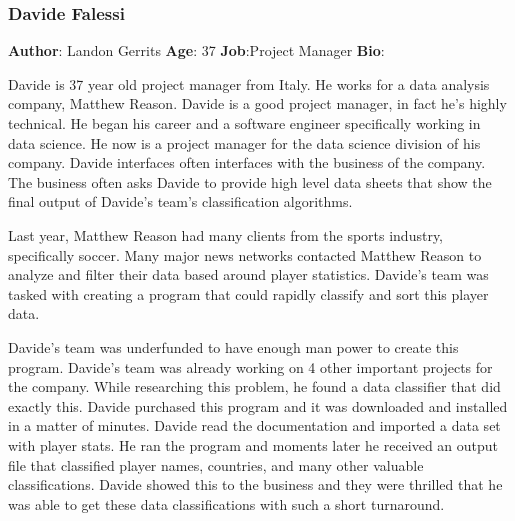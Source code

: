 \documentclass[12pt,oneside,letterpaper]{article}
\begin{document}
\subsubsection{Davide Falessi}
\textbf{Author}: Landon Gerrits\newline
\textbf{Age}: 37\newline
\textbf{Job}:Project Manager\newline
\textbf{Bio}:\newline
\par Davide is 37 year old project manager from Italy. He works for a data analysis company, Matthew Reason. Davide is a good project manager, in fact he's highly technical. He began his career and a software engineer specifically working in data science. He now is a project manager for the data science division of his company. Davide interfaces often interfaces with the business of the company. The business often asks Davide to provide high level data sheets that show the final output of Davide's team's classification algorithms.
\par Last year, Matthew Reason had many clients from the sports industry, specifically soccer. Many major news networks contacted Matthew Reason to analyze and filter their data based around player statistics. Davide's team was tasked with creating a program that could rapidly classify and sort this player data.
\par Davide's team was underfunded to have enough man power to create this program. Davide's team was already working on 4 other important projects for the company. While researching this problem, he found a data classifier that did exactly this. Davide purchased this program and it was downloaded and installed in a matter of minutes. Davide read the documentation and imported a data set with player stats. He ran the program and moments later he received an output file that classified player names, countries, and many other valuable classifications. Davide showed this to the business and they were thrilled that he was able to get these data classifications with such a short turnaround.
\end{document}
